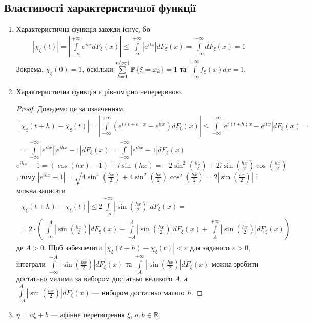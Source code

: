 \subsection{Властивості характеристичної функції}
\begin{enumerate}
    \item Характеристична функція завжди існує, бо 
    \begin{gather*}
        \left|\chi_\xi(t)\right| = \left|\int\limits_{-\infty}^{+\infty} e^{itx} dF_\xi(x)\right| 
        \leq \int\limits_{-\infty}^{+\infty} \left|e^{itx}\right| dF_\xi(x) = \int\limits_{-\infty}^{+\infty} dF_\xi(x) = 1
    \end{gather*}
    Зокрема, $\chi_\xi(0) = 1$, оскільки $\sum\limits_{k=1}^{n(\infty)}\P\left\{\xi = x_k\right\} = 1$ та $\int\limits_{-\infty}^{+\infty} f_\xi(x)dx = 1$.
    \item Характеристична функція є рівномірно неперервною.
    \begin{proof} Доведемо це за означенням.
        \begin{gather*}
            \left| \chi_\xi(t+h) - \chi_\xi(t) \right| = 
            \left| \int\limits_{-\infty}^{+\infty} \left( e^{i(t+h)x} - e^{itx}\right) dF_\xi(x) \right| \leq
            \int\limits_{-\infty}^{+\infty} \left|e^{i(t+h)x} - e^{itx}\right| dF_\xi(x) = \\ =
            \int\limits_{-\infty}^{+\infty} \left|e^{itx}\right|\left| e^{ihx} - 1\right| dF_\xi(x) = 
            \int\limits_{-\infty}^{+\infty} \left|e^{ihx} - 1\right| dF_\xi(x)
        \end{gather*}
        $e^{ihx} - 1 = (\cos(hx) - 1) + i\sin(hx) = -2\sin^2\left(\frac{hx}{2}\right) + 2i\sin\left(\frac{hx}{2}\right)\cos(\frac{hx}{2})$,
        тому $\left| e^{ihx} - 1\right| = 
        \sqrt{4\sin^4\left(\frac{hx}{2}\right) + 4\sin^2\left(\frac{hx}{2}\right)\cos^2\left(\frac{hx}{2}\right)} = 2\left| \sin\left(\frac{hx}{2}\right)\right|$
        і можна записати 
        \begin{gather*}
            \left| \chi_\xi(t+h) - \chi_\xi(t) \right| \leq 2 \int\limits_{-\infty}^{+\infty} \left| \sin\left(\frac{hx}{2}\right)\right| dF_\xi(x) = 
            \\ = 2\cdot \left( \int\limits_{-\infty}^{-A}\left| \sin\left(\frac{hx}{2}\right)\right| dF_\xi(x) + 
            \int\limits_{-A}^{A}\left| \sin\left(\frac{hx}{2}\right)\right| dF_\xi(x) + 
            \int\limits_{A}^{+\infty}\left| \sin\left(\frac{hx}{2}\right)\right| dF_\xi(x)\right)
        \end{gather*}
        де $A > 0$. Щоб забезпечити $\left| \chi_\xi(t+h) - \chi_\xi(t) \right| < \varepsilon$ для заданого $\varepsilon > 0$,
        інтеграли $\int\limits_{-\infty}^{-A}\left| \sin\left(\frac{hx}{2}\right)\right| dF_\xi(x)$ та 
        $\int\limits_{A}^{+\infty}\left| \sin\left(\frac{hx}{2}\right)\right| dF_\xi(x)$ можна зробити достатньо малими
        за вибором достатньо великого $A$, а $\int\limits_{-A}^{A}\left| \sin\left(\frac{hx}{2}\right)\right| dF_\xi(x)$ --- вибором
        достатньо малого $h$.
    \end{proof}
    \item $\eta = a\xi + b$ --- афінне перетворення $\xi$, $a, b \in \mathbb{R}$.


\end{enumerate}
